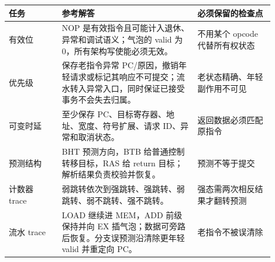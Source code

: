 \begin{longtable}{L{0.18\linewidth}L{0.46\linewidth}L{0.26\linewidth}}
\toprule
任务 & 参考解答 & 必须保留的检查点 \\
\midrule
有效位 & NOP 是有效指令且可能计入退休、异常和调试语义；气泡的 valid 为 0，所有架构写使能必须无效。 & 不用某个 opcode 代替所有权状态 \\
优先级 & 保存老指令异常 PC/原因，撤销年轻请求或标记其响应不可提交；流水转入异常入口，同时保证已接受事务不会失去归属。 & 老状态精确、年轻副作用不可见 \\
可变时延 & 至少保存 PC、目标寄存器、地址、宽度、符号扩展、请求 ID、异常和取消状态。 & 返回数据必须匹配原指令 \\
预测结构 & BHT 预测方向，BTB 给普通控制转移目标，RAS 给 return 目标；解析结果负责校验并恢复。 & 预测不等于提交 \\
计数器 trace & 弱跳转依次到强跳转、强跳转、弱跳转、弱不跳转、强不跳转。 & 强态需两次相反结果才翻转预测 \\
流水 trace & LOAD 继续进 MEM，ADD 前级保持并向 EX 插气泡；数据可旁路后恢复。分支误预测沿清除更年轻 valid 并重定向 PC。 & 老指令不被误清除 \\
\bottomrule
\end{longtable}
